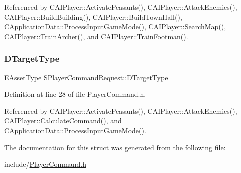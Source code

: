 Referenced by C\+A\+I\+Player\+::\+Activate\+Peasants(), C\+A\+I\+Player\+::\+Attack\+Enemies(), C\+A\+I\+Player\+::\+Build\+Building(), C\+A\+I\+Player\+::\+Build\+Town\+Hall(), C\+Application\+Data\+::\+Process\+Input\+Game\+Mode(), C\+A\+I\+Player\+::\+Search\+Map(), C\+A\+I\+Player\+::\+Train\+Archer(), and C\+A\+I\+Player\+::\+Train\+Footman().

\hypertarget{structSPlayerCommandRequest_a864e47c641127665751091876a6d3c5e}{}\label{structSPlayerCommandRequest_a864e47c641127665751091876a6d3c5e} 
\subsubsection{\texorpdfstring{D\+Target\+Type}{DTargetType}}
{\footnotesize\ttfamily \hyperlink{GameDataTypes_8h_a5600d4fc433b83300308921974477fec}{E\+Asset\+Type} S\+Player\+Command\+Request\+::\+D\+Target\+Type}



Definition at line 28 of file Player\+Command.\+h.



Referenced by C\+A\+I\+Player\+::\+Activate\+Peasants(), C\+A\+I\+Player\+::\+Attack\+Enemies(), C\+A\+I\+Player\+::\+Calculate\+Command(), and C\+Application\+Data\+::\+Process\+Input\+Game\+Mode().



The documentation for this struct was generated from the following file\+:\begin{DoxyCompactItemize}
\item 
include/\hyperlink{PlayerCommand_8h}{Player\+Command.\+h}\end{DoxyCompactItemize}
